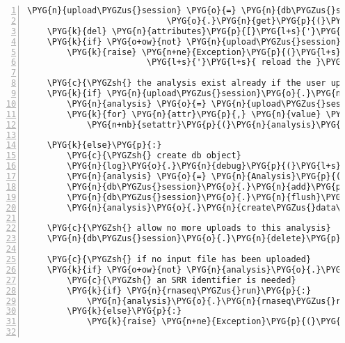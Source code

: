 \begin{Verbatim}[commandchars=\\\{\},numbers=left,firstnumber=1,stepnumber=5]
    \PYG{n}{upload\PYGZus{}session} \PYG{o}{=} \PYG{n}{db\PYGZus{}session}\PYG{o}{.}\PYG{n}{query}\PYG{p}{(}\PYG{n}{UploadSession}\PYG{p}{)} \PYGZbs{}
                            \PYG{o}{.}\PYG{n}{get}\PYG{p}{(}\PYG{n}{attributes}\PYG{p}{[}\PYG{l+s}{'}\PYG{l+s}{upload\PYGZus{}session}\PYG{l+s}{'}\PYG{p}{]}\PYG{p}{)}
    \PYG{k}{del} \PYG{n}{attributes}\PYG{p}{[}\PYG{l+s}{'}\PYG{l+s}{upload\PYGZus{}session}\PYG{l+s}{'}\PYG{p}{]}
    \PYG{k}{if} \PYG{o+ow}{not} \PYG{n}{upload\PYGZus{}session}\PYG{p}{:}
        \PYG{k}{raise} \PYG{n+ne}{Exception}\PYG{p}{(}\PYG{l+s}{'}\PYG{l+s}{this session has expired -}\PYG{l+s}{'}
                        \PYG{l+s}{'}\PYG{l+s}{ reload the }\PYG{l+s}{"}\PYG{l+s}{New Analysis}\PYG{l+s}{"}\PYG{l+s}{ page to start a new one}\PYG{l+s}{'}\PYG{p}{)}

    \PYG{c}{\PYGZsh{} the analysis exist already if the user uploaded something}
    \PYG{k}{if} \PYG{n}{upload\PYGZus{}session}\PYG{o}{.}\PYG{n}{analysis}\PYG{p}{:}
        \PYG{n}{analysis} \PYG{o}{=} \PYG{n}{upload\PYGZus{}session}\PYG{o}{.}\PYG{n}{analysis}
        \PYG{k}{for} \PYG{n}{attr}\PYG{p}{,} \PYG{n}{value} \PYG{o+ow}{in} \PYG{n}{attributes}\PYG{o}{.}\PYG{n}{items}\PYG{p}{(}\PYG{p}{)}\PYG{p}{:}
            \PYG{n+nb}{setattr}\PYG{p}{(}\PYG{n}{analysis}\PYG{p}{,} \PYG{n}{attr}\PYG{p}{,} \PYG{n}{value}\PYG{p}{)}

    \PYG{k}{else}\PYG{p}{:}
        \PYG{c}{\PYGZsh{} create db object}
        \PYG{n}{log}\PYG{o}{.}\PYG{n}{debug}\PYG{p}{(}\PYG{l+s}{"}\PYG{l+s}{creating new analysis: }\PYG{l+s+si}{\PYGZpc{}s}\PYG{l+s}{"} \PYG{o}{\PYGZpc{}} \PYG{n}{attributes}\PYG{p}{)}
        \PYG{n}{analysis} \PYG{o}{=} \PYG{n}{Analysis}\PYG{p}{(}\PYG{o}{*}\PYG{o}{*}\PYG{n}{attributes}\PYG{p}{)}
        \PYG{n}{db\PYGZus{}session}\PYG{o}{.}\PYG{n}{add}\PYG{p}{(}\PYG{n}{analysis}\PYG{p}{)}
        \PYG{n}{db\PYGZus{}session}\PYG{o}{.}\PYG{n}{flush}\PYG{p}{(}\PYG{p}{)} \PYG{c}{\PYGZsh{} sets analysis.id}
        \PYG{n}{analysis}\PYG{o}{.}\PYG{n}{create\PYGZus{}data\PYGZus{}dir}\PYG{p}{(}\PYG{p}{)}

    \PYG{c}{\PYGZsh{} allow no more uploads to this analysis}
    \PYG{n}{db\PYGZus{}session}\PYG{o}{.}\PYG{n}{delete}\PYG{p}{(}\PYG{n}{upload\PYGZus{}session}\PYG{p}{)}

    \PYG{c}{\PYGZsh{} if no input file has been uploaded}
    \PYG{k}{if} \PYG{o+ow}{not} \PYG{n}{analysis}\PYG{o}{.}\PYG{n}{inputfile\PYGZus{}name}\PYG{p}{:}
        \PYG{c}{\PYGZsh{} an SRR identifier is needed}
        \PYG{k}{if} \PYG{n}{rnaseq\PYGZus{}run}\PYG{p}{:}
            \PYG{n}{analysis}\PYG{o}{.}\PYG{n}{rnaseq\PYGZus{}run} \PYG{o}{=} \PYG{n}{rnaseq\PYGZus{}run}
        \PYG{k}{else}\PYG{p}{:}
            \PYG{k}{raise} \PYG{n+ne}{Exception}\PYG{p}{(}\PYG{l+s}{"}\PYG{l+s}{Please upload an input file or specify an SRR id}\PYG{l+s}{"}\PYG{p}{)}


\end{Verbatim}
